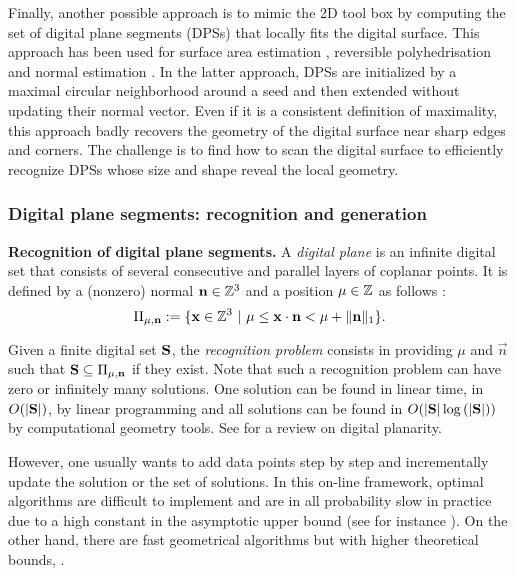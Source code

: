 Finally, another possible approach is to mimic the 2D tool box by computing the set of
digital plane segments (DPSs) that locally fits the digital surface. This approach
has been used for surface area estimation \cite{Klette2001}, reversible polyhedrisation
\cite{Sivignon2004} and normal estimation \cite{Charrier2011}. In the latter approach,
DPSs are initialized by a maximal circular neighborhood around a seed and then extended
without updating their normal vector. Even if it is a consistent definition of maximality,
this approach badly recovers the geometry of the digital surface near sharp edges and corners. 
The challenge is to find how to scan the digital surface to efficiently recognize DPSs
whose size and shape reveal the local geometry. 

\subsubsection{Digital plane segments: recognition and generation}
\label{sec:dps}

\noindent\textbf{Recognition of digital plane segments.}
A \emph{digital plane} is an infinite digital set that 
consists of several consecutive and parallel layers of coplanar points. 
It is defined by a (nonzero) normal $\mathbf{n} \in {\ensuremath\mathbb{Z}}^3$ and a position $\mu \in {\ensuremath\mathbb{Z}}$ as follows
\cite{reveilles1991}:  
\begin{equation}
  \label{eq:plane}
\Pi_{\mu,\mathbf{n}} := \{ \mathbf{x} \in {\ensuremath\mathbb{Z}}^3 \ | \ \mu \leq \mathbf{x} \cdot \mathbf{n} < \mu + \|\mathbf{n}\|_1 \}.
\end{equation}

Given a finite digital set $\mathbf{S}$, the \emph{recognition problem} consists in providing
$\mu$ and $\vec{n}$ such that $\mathbf{S} \subseteq \Pi_{\mu,\mathbf{n}}$ if they exist.
Note that such a recognition problem can have zero or infinitely many solutions.
One solution can be found in linear time, \ie in $O(|\mathbf{S}|)$, by linear programming
and all solutions can be found in $O(|\mathbf{S}|\log{(|\ensuremath{\mathbf{S}}|)})$ by computational geometry tools.
See \cite{Brimkov2007} for a review on digital planarity.

However, one usually wants to add data points step by step and incrementally update the solution
or the set of solutions. In this on-line framework, optimal algorithms are difficult
to implement and are in all probability slow in practice due to a high constant in the asymptotic
upper bound (see for instance \cite{Buzer2003}).
On the other hand, there are fast geometrical algorithms but with higher theoretical bounds,
\eg \cite{Gerard2005, Charrier2008, Veelaert2012}.

